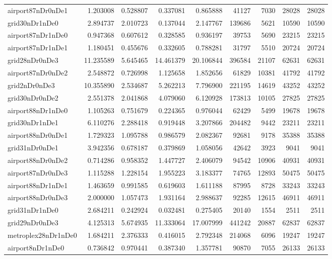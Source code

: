 \begin{longtable}{|l|r|r|r|r|r|r|r|r|}
airport87nDr0nDe1 & 1.203008 & 0.528807 & 0.337081 & 0.865888 & 41127 & 7030 & 28028 & 28028 \\
grid30nDr1nDe0 & 2.894737 & 2.010723 & 0.137044 & 2.147767 & 139686 & 5621 & 10590 & 10590 \\
airport87nDr1nDe0 & 0.947368 & 0.607612 & 0.328585 & 0.936197 & 39753 & 5690 & 23215 & 23215 \\
airport87nDr1nDe1 & 1.180451 & 0.455676 & 0.332605 & 0.788281 & 31797 & 5510 & 20724 & 20724 \\
grid28nDr0nDe3 & 11.235589 & 5.645465 & 14.461379 & 20.106844 & 396584 & 21107 & 62631 & 62631 \\
airport87nDr0nDe2 & 2.548872 & 0.726998 & 1.125658 & 1.852656 & 61829 & 10381 & 41792 & 41792 \\
grid2nDr0nDe3 & 10.355890 & 2.534687 & 5.262213 & 7.796900 & 221195 & 14619 & 43252 & 43252 \\
grid30nDr0nDe2 & 2.551378 & 2.041868 & 4.079060 & 6.120928 & 173813 & 10105 & 27825 & 27825 \\
airport88nDr1nDe0 & 1.105263 & 0.751679 & 0.224365 & 0.976044 & 62429 & 5499 & 19678 & 19678 \\
grid30nDr1nDe1 & 6.110276 & 2.288418 & 0.919448 & 3.207866 & 204482 & 9442 & 23211 & 23211 \\
airport88nDr0nDe1 & 1.729323 & 1.095788 & 0.986579 & 2.082367 & 92681 & 9178 & 35388 & 35388 \\
grid31nDr0nDe1 & 3.942356 & 0.678187 & 0.379869 & 1.058056 & 42642 & 3923 & 9041 & 9041 \\
airport88nDr0nDe2 & 0.714286 & 0.958352 & 1.447727 & 2.406079 & 94542 & 10906 & 40931 & 40931 \\
airport87nDr0nDe3 & 1.115288 & 1.228154 & 1.955223 & 3.183377 & 74765 & 12893 & 50475 & 50475 \\
airport88nDr1nDe1 & 1.463659 & 0.991585 & 0.619603 & 1.611188 & 87995 & 8728 & 33243 & 33243 \\
airport88nDr0nDe3 & 2.000000 & 1.057473 & 1.931164 & 2.988637 & 92285 & 12615 & 46911 & 46911 \\
grid31nDr1nDe0 & 2.684211 & 0.242924 & 0.032481 & 0.275405 & 20140 & 1554 & 2511 & 2511 \\
grid29nDr0nDe3 & 4.125313 & 5.674935 & 11.333064 & 17.007999 & 441242 & 20887 & 62837 & 62837 \\
metroplex28nDr1nDe0 & 1.684211 & 2.376333 & 0.416015 & 2.792348 & 214068 & 6096 & 19247 & 19247 \\
airport8nDr1nDe0 & 0.736842 & 0.970441 & 0.387340 & 1.357781 & 90870 & 7055 & 26133 & 26133 \\

\end{longtable}
